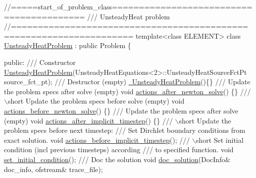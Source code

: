  
\begin{DoxyCodeInclude}
\textcolor{comment}{//=====start\_of\_problem\_class=========================================}
\textcolor{comment}{/// UnsteadyHeat problem }
\textcolor{comment}{}\textcolor{comment}{//====================================================================}
\textcolor{keyword}{template}<\textcolor{keyword}{class} ELEMENT>
\textcolor{keyword}{class }\hyperlink{classUnsteadyHeatProblem}{UnsteadyHeatProblem} : \textcolor{keyword}{public} Problem
\{

\textcolor{keyword}{public}:
\textcolor{comment}{}
\textcolor{comment}{ /// Constructor}
\textcolor{comment}{} \hyperlink{classUnsteadyHeatProblem_abd3a46eea132b1e5872be6a6309a51b2}{UnsteadyHeatProblem}(UnsteadyHeatEquations<2>::UnsteadyHeatSourceFctPt 
 source\_fct\_pt);
\textcolor{comment}{}
\textcolor{comment}{ /// Destructor (empty)}
\textcolor{comment}{} \hyperlink{classUnsteadyHeatProblem_acd342b40828d9e18b3571e00b3d34add}{~UnsteadyHeatProblem}()\{\}
\textcolor{comment}{}
\textcolor{comment}{ /// Update the problem specs after solve (empty)}
\textcolor{comment}{} \textcolor{keywordtype}{void} \hyperlink{classUnsteadyHeatProblem_a88e3d534b5904f7c10ce6a8fbd6df0ea}{actions\_after\_newton\_solve}() \{\}
\textcolor{comment}{}
\textcolor{comment}{ /// \(\backslash\)short Update the problem specs before solve (empty)}
\textcolor{comment}{} \textcolor{keywordtype}{void} \hyperlink{classUnsteadyHeatProblem_aa1ee8fbe2a5439d1cacb37131e0f81c6}{actions\_before\_newton\_solve}() \{\}
\textcolor{comment}{}
\textcolor{comment}{ /// Update the problem specs after solve (empty)}
\textcolor{comment}{} \textcolor{keywordtype}{void} \hyperlink{classUnsteadyHeatProblem_afd14cbe343adfa39e3b8b2ca681c5020}{actions\_after\_implicit\_timestep}() \{\}
\textcolor{comment}{}
\textcolor{comment}{ /// \(\backslash\)short Update the problem specs before next timestep: }
\textcolor{comment}{ /// Set Dirchlet boundary conditions from exact solution.}
\textcolor{comment}{} \textcolor{keywordtype}{void} \hyperlink{classUnsteadyHeatProblem_a7074e52f6a3a791549687e1b4ddd059a}{actions\_before\_implicit\_timestep}();
\textcolor{comment}{}
\textcolor{comment}{ /// \(\backslash\)short Set initial condition (incl previous timesteps) according}
\textcolor{comment}{ /// to specified function. }
\textcolor{comment}{} \textcolor{keywordtype}{void} \hyperlink{classUnsteadyHeatProblem_a98de3ed2d9cf5409323121bbb482bc1b}{set\_initial\_condition}();
\textcolor{comment}{}
\textcolor{comment}{ /// Doc the solution}
\textcolor{comment}{} \textcolor{keywordtype}{void} \hyperlink{classUnsteadyHeatProblem_a2c0c4b762d2dbde7396dca2a6750f433}{doc\_solution}(DocInfo& doc\_info, ofstream& trace\_file);
 

\end{DoxyCodeInclude}
